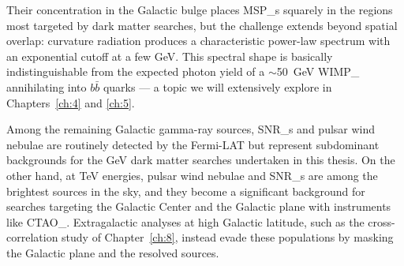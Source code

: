 Their concentration in the Galactic bulge places \glspl{MSP_} squarely in the regions most targeted by dark matter searches, but the challenge extends beyond spatial overlap: curvature radiation produces a characteristic power-law spectrum with an exponential cutoff at a few GeV.
This spectral shape is basically indistinguishable from the expected photon yield of a $\sim$50~GeV \gls{WIMP_} annihilating into $b\bar{b}$ quarks \cite{Cirelli:2024ssz} --- a topic we will extensively explore in Chapters~\ref{ch:4} and \ref{ch:5}.


Among the remaining Galactic gamma-ray sources, \glspl{SNR_} and pulsar wind nebulae are routinely detected by the Fermi-LAT but represent subdominant backgrounds for the GeV dark matter searches undertaken in this thesis.
On the other hand, at TeV energies, pulsar wind nebulae and \glspl{SNR_} are among the brightest sources in the sky, and they become a significant background for searches targeting the Galactic Center and the Galactic plane with instruments like \gls{CTAO_}. Extragalactic analyses at high Galactic latitude, such as the cross-correlation study of Chapter~\ref{ch:8}, instead evade these populations by masking the Galactic plane and the resolved sources.



